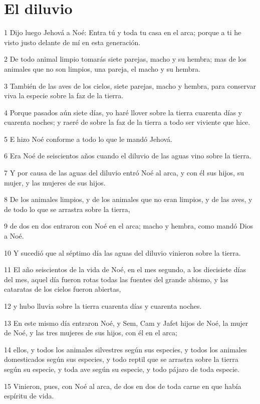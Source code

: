 \section*{El diluvio}

\par 1 Dijo luego Jehová a Noé: Entra tú y toda tu casa en el arca; porque a ti he visto justo delante de mí en esta generación.
\par 2 De todo animal limpio tomarás siete parejas, macho y su hembra; mas de los animales que no son limpios, una pareja, el macho y su hembra.
\par 3 También de las aves de los cielos, siete parejas, macho y hembra, para conservar viva la especie sobre la faz de la tierra.
\par 4 Porque pasados aún siete días, yo haré llover sobre la tierra cuarenta días y cuarenta noches; y raeré de sobre la faz de la tierra a todo ser viviente que hice.
\par 5 E hizo Noé conforme a todo lo que le mandó Jehová.
\par 6 Era Noé de seiscientos años cuando el diluvio de las aguas vino sobre la tierra.
\par 7 Y por causa de las aguas del diluvio entró Noé al arca, y con él sus hijos, su mujer, y las mujeres de sus hijos.
\par 8 De los animales limpios, y de los animales que no eran limpios, y de las aves, y de todo lo que se arrastra sobre la tierra,
\par 9 de dos en dos entraron con Noé en el arca; macho y hembra, como mandó Dios a Noé.
\par 10 Y sucedió que al séptimo día las aguas del diluvio vinieron sobre la tierra.
\par 11 El año seiscientos de la vida de Noé, en el mes segundo, a los diecisiete días del mes, aquel día fueron rotas todas las fuentes del grande abismo, y las cataratas de los cielos fueron abiertas,
\par 12 y hubo lluvia sobre la tierra cuarenta días y cuarenta noches.
\par 13 En este mismo día entraron Noé, y Sem, Cam y Jafet hijos de Noé, la mujer de Noé, y las tres mujeres de sus hijos, con él en el arca;
\par 14 ellos, y todos los animales silvestres según sus especies, y todos los animales domesticados según sus especies, y todo reptil que se arrastra sobre la tierra según su especie, y toda ave según su especie, y todo pájaro de toda especie.
\par 15 Vinieron, pues, con Noé al arca, de dos en dos de toda carne en que había espíritu de vida.
